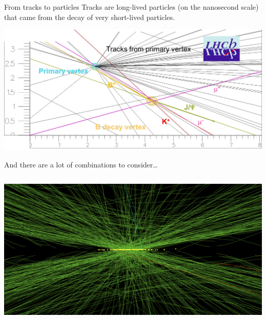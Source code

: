 \documentclass[aspectratio=169]{beamer}
\begin{document}
\begin{frame}{From tracks to particles}
\vspace{0.25 cm}
Tracks are long-lived particles (on the nanosecond scale) that came from the decay of very short-lived particles.

\vspace{-0.5 cm}
\begin{center}
\includegraphics[width=0.9\linewidth]{lhcb.png}
\end{center}

\vspace{-0.25 cm}
\end{frame}

\begin{frame}{And there are a lot of combinations to consider\ldots}
\vspace{0.15 cm}
\begin{columns}
\includegraphics[width=\linewidth]{pileup.png}
\end{columns}
\end{frame}
\end{document}
